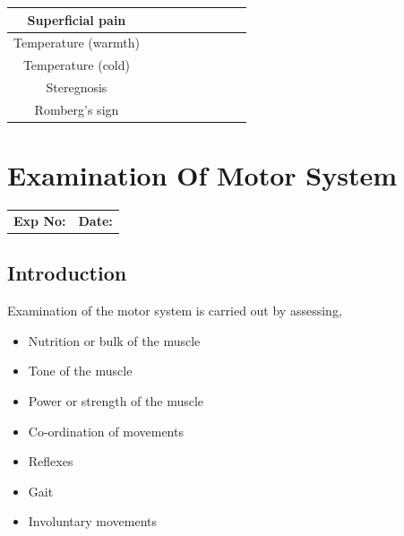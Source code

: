\documentclass[a4paper,12pt,openany,oneside]{book}
\begin{document}
\begin{table}[H]
{\begin{tabular}{|c|c|c|c|c|c|c|c|c|}
Superficial pain                    &                    &                   &                    &                   &                   &                  &                   &                  \\ \hline
Temperature (warmth)                &                    &                   &                    &                   &                   &                  &                   &                  \\ \hline
Temperature (cold)                  &                    &                   &                    &                   &                   &                  &                   &                  \\ \hline
Steregnosis                         &                    &                   &                    &                   &                   &                  &                   &                  \\ \hline
Romberg's sign                      & \multicolumn{8}{c|}{}                                                                                                                                         \\ \hline
\end{tabular}%
}
\end{table}
\renewcommand{\arraystretch}{1}
															\chapter*{\centering Examination Of Motor System}
															\begin{tabular}{p{5in} p{1in}}
																\textbf{Exp No:}  & \textbf{Date:}\\
															\end{tabular}
															\section*{Introduction}
Examination of the motor system is carried out by assessing,
\begin{itemize}
\item{Nutrition or bulk of the muscle}
\item{Tone of the muscle}
\item{Power or strength of the muscle}
\item{Co-ordination of movements}
\item{Reflexes}
\item{Gait}
\item{Involuntary movements}
\end{itemize}
\end{document}
